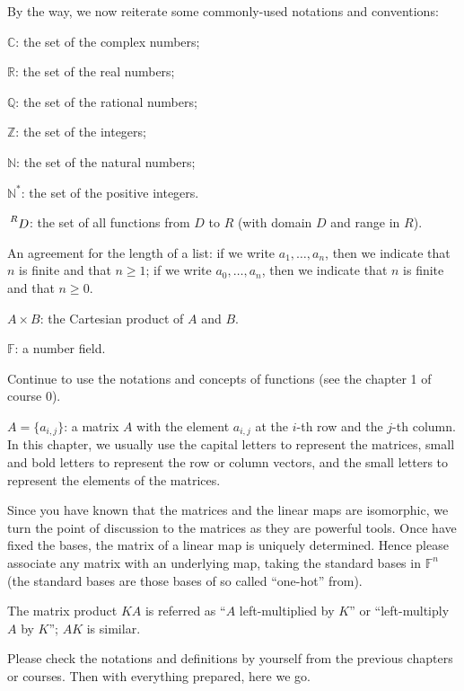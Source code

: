 \documentclass{article}
\begin{document}
By the way, we now reiterate some commonly-used notations and conventions:
\begin{compactenum}
    \item $\mathbb{C}$: the set of the complex numbers;
    \item $\mathbb{R}$: the set of the real numbers;
    \item $\mathbb{Q}$: the set of the rational numbers;
    \item $\mathbb{Z}$: the set of the integers;
    \item $\mathbb{N}$: the set of the natural numbers;
    \item $\mathbb{N^\ast}$: the set of the positive integers.
    \item $\sideset{^R}{}{\mathop{D}}$: the set of all functions from $D$ to $R$ (with domain $D$ and range in $R$).
    \item An agreement for the length of a list: if we write $a_1, \dots, a_n$, then we indicate that $n$ is finite and that $n\geq 1$; if we write $a_0, \dots, a_n$, then we indicate that $n$ is finite and that $n\geq 0$.
    \item $A\times B$: the Cartesian product of $A$ and $B$.
    \item $\mathbb{F}$: a number field.
    \item Continue to use the notations and concepts of functions (see the chapter 1 of course 0).
    \item $A = \{a_{i,j}\}$: a matrix $A$ with the element $a_{i,j}$ at the $i$-th row and the $j$-th column. In this chapter, we usually use the capital letters to represent the matrices, small and bold letters to represent the row or column vectors, and the small letters to represent the elements of the matrices.
    \item Since you have known that the matrices and the linear maps are isomorphic, we turn the point of discussion to the matrices as they are powerful tools. Once have fixed the bases, the matrix of a linear map is uniquely determined. Hence please associate any matrix with an underlying map, taking the standard bases in $\mathbb{F}^n$ (the standard bases are those bases of so called ``one-hot'' from).
    \item The matrix product $KA$ is referred as ``$A$ left-multiplied by $K$'' or ``left-multiply $A$ by $K$''; $AK$ is similar.
\end{compactenum} 
Please check the notations and definitions by yourself from the previous chapters or courses. Then with everything prepared, here we go.
\end{document}
